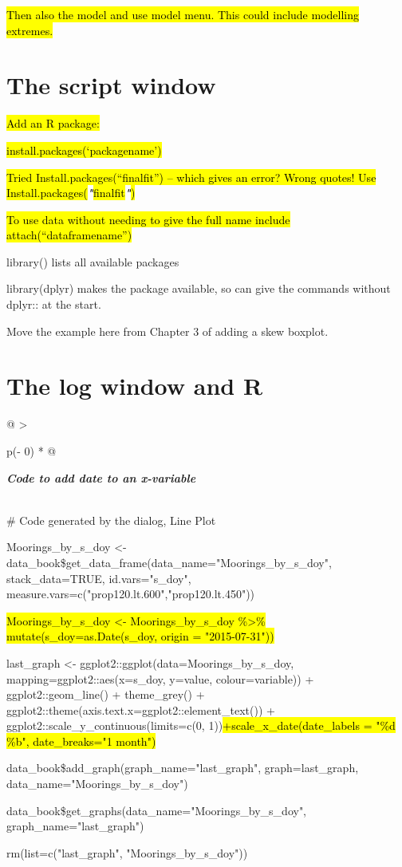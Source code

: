 \documentclass[
  letterpaper,
  DIV=11,
  numbers=noendperiod]{scrreprt}
\begin{document}
\hl{Then also the model and use model menu. This could include modelling
extremes.}

\section{The script window}\label{the-script-window}

\hl{Add an R package:}

\hl{install.packages(`packagename')}

\hl{Tried Install.packages(``finalfit'') -- which gives an error? Wrong
quotes! Use
Install.packages(}\textbf{\emph{"}}\hl{finalfit}\textbf{\emph{"}}\hl{)}

\hl{To use data without needing to give the full name include
attach(``dataframename'')}

library() lists all available packages

library(dplyr) makes the package available, so can give the commands
without dplyr:: at the start.

Move the example here from Chapter 3 of adding a skew boxplot.

\section{The log window and R}\label{the-log-window-and-r}

\begin{longtable}[]{@{}
  >{\raggedright\arraybackslash}p{(\columnwidth - 0\tabcolsep) * }@{}}
\toprule\noalign{}
\begin{minipage}[b]{\linewidth}\raggedright
\textbf{\emph{Code to add date to an x-variable}}
\end{minipage} \\
\midrule\noalign{}
\endhead
\bottomrule\noalign{}
\endlastfoot
\# Code generated by the dialog, Line Plot

Moorings\_by\_s\_doy \textless-
data\_book\$get\_data\_frame(data\_name="Moorings\_by\_s\_doy",
stack\_data=TRUE, id.vars="s\_doy",
measure.vars=c("prop120.lt.600","prop120.lt.450"))

\hl{Moorings\_by\_s\_doy \textless- Moorings\_by\_s\_doy
\%\textgreater\% mutate(s\_doy=as.Date(s\_doy, origin = "2015-07-31"))}

last\_graph \textless- ggplot2::ggplot(data=Moorings\_by\_s\_doy,
mapping=ggplot2::aes(x=s\_doy, y=value, colour=variable)) +
ggplot2::geom\_line() + theme\_grey() +
ggplot2::theme(axis.text.x=ggplot2::element\_text()) +
ggplot2::scale\_y\_continuous(limits=c(0,
1))\hl{+scale\_x\_date(date\_labels = "\%d \%b", date\_breaks="1
month")}

data\_book\$add\_graph(graph\_name="last\_graph", graph=last\_graph,
data\_name="Moorings\_by\_s\_doy")

data\_book\$get\_graphs(data\_name="Moorings\_by\_s\_doy",
graph\_name="last\_graph")

rm(list=c("last\_graph", "Moorings\_by\_s\_doy")) \\
\end{longtable}
\end{document}
